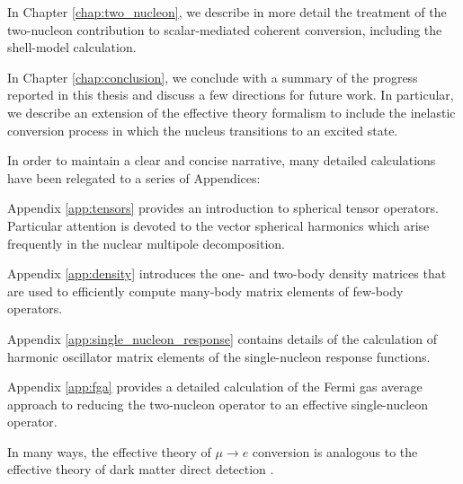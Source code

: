 \documentclass{book}[letterpaper,12pt]
\begin{document}
In Chapter \ref{chap:two_nucleon}, we describe in more detail the treatment of the two-nucleon contribution to scalar-mediated coherent conversion, including the shell-model calculation.

In Chapter \ref{chap:conclusion}, we conclude with a summary of the progress reported in this thesis and discuss a few directions for future work. In particular, we describe an extension of the effective theory formalism to include the inelastic conversion process in which the nucleus transitions to an excited state.

In order to maintain a clear and concise narrative, many detailed calculations have been relegated to a series of Appendices:

Appendix \ref{app:tensors} provides an introduction to spherical tensor operators. Particular attention is devoted to the vector spherical harmonics which arise frequently in the nuclear multipole decomposition.

Appendix \ref{app:density} introduces the one- and two-body density matrices that are used to efficiently compute many-body matrix elements of few-body operators.

Appendix \ref{app:single_nucleon_response} contains details of the calculation of harmonic oscillator matrix elements of the single-nucleon response functions.

Appendix \ref{app:fga} provides a detailed calculation of the Fermi gas average approach to reducing the two-nucleon operator to an effective single-nucleon operator.


In many ways, the effective theory of $\mu\rightarrow e$ conversion is analogous to the effective theory of dark matter direct detection \cite{Fitzpatrick_2013,Anand:2014kea}.

 
\end{document}
